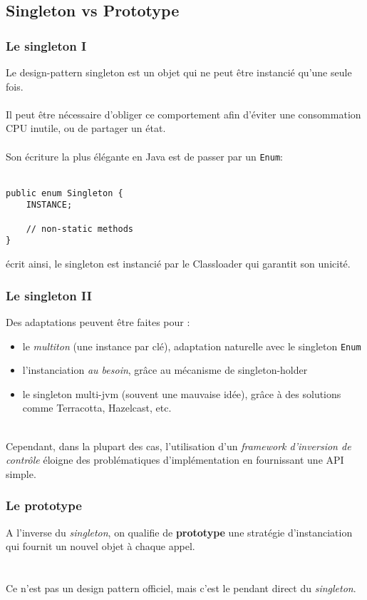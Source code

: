 \subsection{Singleton vs Prototype}
\begin{frame}[fragile]
	\frametitle{Le singleton I}

    Le design-pattern singleton est un objet qui ne peut \^{e}tre instanci\'{e} qu'une seule fois.
    \\~\\
    Il peut \^{e}tre n\'{e}cessaire d'obliger ce comportement afin d'\'{e}viter une consommation CPU inutile, ou de partager un \'{e}tat.
    \\~\\
    Son \'{e}criture la plus \'{e}l\'{e}gante en Java est de passer par un {\lstinline[basicstyle=\ttfamily\color{blue}]|Enum|}:
    \\~\\
    \begin{lstlisting}
public enum Singleton {
	INSTANCE;

    // non-static methods
}
	\end{lstlisting}
    \'{e}crit ainsi, le singleton est instanci\'{e} par le Classloader qui garantit son unicit\'{e}.
\end{frame}

\begin{frame}[fragile]
	\frametitle{Le singleton II}

	Des adaptations peuvent \^{e}tre faites pour :
    \begin{itemize}
    	\item le \textit{multiton} (une instance par cl\'{e}), adaptation naturelle avec le singleton {\lstinline[basicstyle=\ttfamily\color{blue}]|Enum|}
        \item l'instanciation \textit{au besoin}, gr\^{a}ce au m\'{e}canisme de singleton-holder
        \item le singleton multi-jvm (souvent une mauvaise id\'{e}e), gr\^{a}ce \`{a} des solutions comme Terracotta, Hazelcast, etc.
    \end{itemize}
    ~\\
    Cependant, dans la plupart des cas, l'utilisation d'un \textit{framework d'inversion
    de contr\^{o}le} \'{e}loigne des probl\'{e}matiques d'impl\'{e}mentation en fournissant une API simple.
\end{frame}

\begin{frame}[fragile]
	\frametitle{Le prototype}

    A l'inverse du \textit{singleton}, on qualifie de \textbf{prototype} une strat\'{e}gie d'instanciation qui fournit un nouvel objet \`{a} chaque appel.
    \\~\\~\\
    Ce n'est pas un design pattern officiel, mais c'est le pendant direct du \textit{singleton}.
\end{frame}

